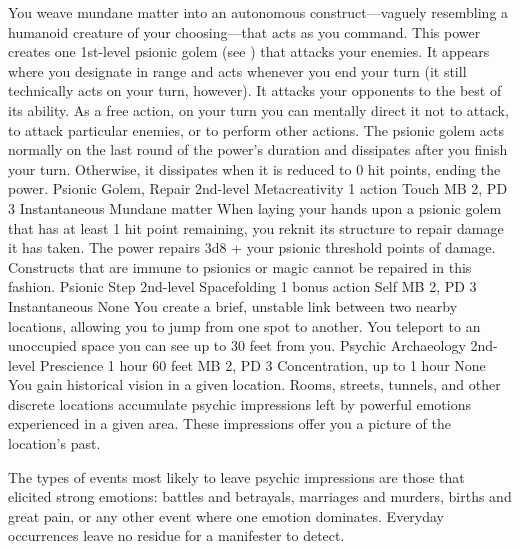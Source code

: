 You weave mundane matter into an autonomous construct---vaguely
resembling a humanoid creature of your choosing---that acts as you command.
This power creates one 1st-level psionic golem
(see )
that attacks your enemies. It appears where you designate
in range and acts whenever you end your turn (it still technically
acts on your turn, however). It attacks your opponents to
the best of its ability. As a free action, on your turn you can mentally
direct it not to attack, to attack particular enemies, or
to perform other actions. The psionic golem acts normally
on the last round of the power's duration and dissipates
after you finish your turn. Otherwise, it dissipates when
it is reduced to 0 hit points, ending the power.
\DndPowerHeader%
    {Psionic Golem, Repair\label{pwr:psionic-golem-repair}}
    {2nd-level Metacreativity}
    {1 action}
    {Touch}
    {MB 2, PD 3}
    {Instantaneous}
    {Mundane matter}
When laying your hands upon a psionic golem
that has at least 1 hit point remaining, you reknit its structure
to repair damage it has taken. The power repairs 3d8 + your psionic
threshold points of damage. Constructs that
are immune to psionics or magic cannot be repaired in this
fashion.
\DndPowerHeader%
    {Psionic Step\label{pwr:psionic-step}}
    {2nd-level Spacefolding}
    {1 bonus action}
    {Self}
    {MB 2, PD 3}
    {Instantaneous}
    {None}
You create a brief, unstable link between
two nearby locations, allowing you to jump from one spot to
another. You teleport to an unoccupied space you can see up
to 30 feet from you.
\DndPowerHeader%
    {Psychic Archaeology\label{pwr:psychic-archaeology}}
    {2nd-level Prescience}
    {1 hour}
    {60 feet}
    {MB 2, PD 3}
    {Concentration, up to 1 hour}
    {None}
You gain historical vision in a given location.
Rooms, streets, tunnels, and other discrete locations accumulate
psychic impressions left by powerful emotions experienced
in a given area. These impressions offer you a picture of
the location's past.

The types of events most likely to leave psychic impressions
are those that elicited strong emotions: battles and betrayals,
marriages and murders, births and great pain, or any other
event where one emotion dominates. Everyday occurrences leave
no residue for a manifester to detect.

